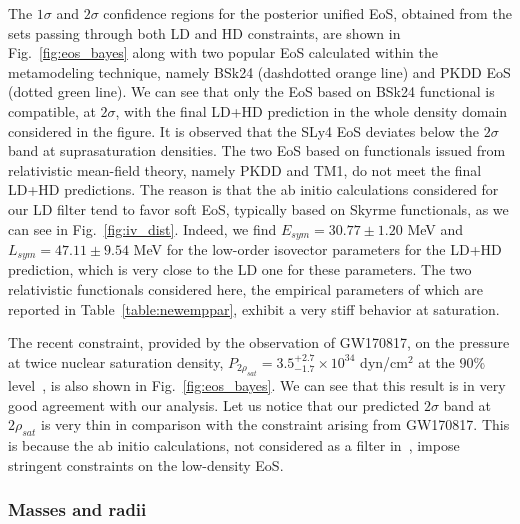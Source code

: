 The $1\sigma$ and $2\sigma$ confidence regions for the posterior unified EoS,
obtained from the sets passing through both LD and HD constraints, are shown in
Fig.~\ref{fig:eos_bayes} along with two popular EoS calculated within the
metamodeling technique, namely BSk24 (dashdotted orange line) and PKDD EoS
(dotted green line). We can see that only the EoS based on BSk24 functional is
compatible, at $2\sigma$, with the final LD+HD prediction in the whole density 
domain considered in the figure. It is observed that the SLy4 EoS deviates
below the $2\sigma$ band at suprasaturation densities.
The two EoS based on functionals issued from relativistic mean-field theory, 
namely PKDD and TM1, do not meet the final LD+HD predictions. The reason is 
that the ab initio calculations considered for our LD filter 
\cite{Drischler2016} tend to favor soft EoS, typically based on Skyrme
functionals, as we can see in Fig.~\ref{fig:iv_dist}. Indeed, we find $E_{sym}
= 30.77 \pm 1.20$ MeV and $L_{sym} = 47.11 \pm 9.54$ MeV for the low-order
isovector parameters for the LD+HD prediction, which is very close to the LD
one for these parameters. The two relativistic functionals considered
here, the empirical parameters of which are reported in
Table~\ref{table:newemppar}, exhibit a very stiff behavior at saturation.
 
The recent constraint, provided by the observation of GW170817, on 
the pressure at twice nuclear saturation density, $P_{2\rho_{sat}} =
3.5_{-1.7}^{+2.7}\times 10^{34}$ dyn/cm$^2$ at the $90\%$ level~\cite{GW1}, is 
also shown in Fig.~\ref{fig:eos_bayes}. We can see that this result is in very 
good agreement with our analysis. Let us notice that our predicted $2\sigma$ 
band at $2\rho_{sat}$ is very thin in comparison with the constraint 
arising from GW170817. This is because the ab initio calculations, not 
considered as a filter in~\cite{GW1}, impose stringent constraints on the 
low-density EoS.

\subsubsection{Masses and radii} %

